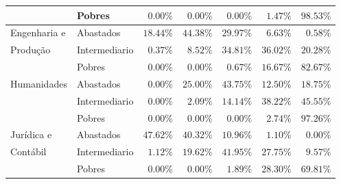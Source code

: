 \begin{table}[h]
\begin{tabular}{ll rrrrr}
                & Pobres                  &               $0.00\%$ &         $0.00\%$ &        $0.00\%$ &       $1.47\%$ &            $98.53\%$ \\%
\midrule
Engenharia e	& Abastados               &              $18.44\%$ &        $44.38\%$ &       $29.97\%$ &       $6.63\%$ &             $0.58\%$ \\%
Produção        & Intermediario           &               $0.37\%$ &         $8.52\%$ &       $34.81\%$ &      $36.02\%$ &            $20.28\%$ \\%
                & Pobres                  &               $0.00\%$ &         $0.00\%$ &        $0.67\%$ &      $16.67\%$ &            $82.67\%$ \\%
\midrule
Humanidades   	& Abastados               &               $0.00\%$ &        $25.00\%$ &       $43.75\%$ &      $12.50\%$ &            $18.75\%$ \\%
                & Intermediario           &               $0.00\%$ &         $2.09\%$ &       $14.14\%$ &      $38.22\%$ &            $45.55\%$ \\%
                & Pobres                  &               $0.00\%$ &         $0.00\%$ &        $0.00\%$ &       $2.74\%$ &            $97.26\%$ \\%
\midrule
Jurídica e		& Abastados               &              $47.62\%$ &        $40.32\%$ &       $10.96\%$ &       $1.10\%$ &             $0.00\%$ \\%
Contábil        & Intermediario           &               $1.12\%$ &        $19.62\%$ &       $41.95\%$ &      $27.75\%$ &             $9.57\%$ \\%
                & Pobres                  &               $0.00\%$ &         $0.00\%$ &        $1.89\%$ &      $28.30\%$ &            $69.81\%$ \\%
\bottomrule
\end{tabular}
\end{table}

